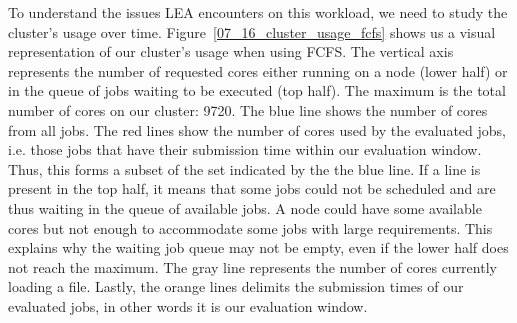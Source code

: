 \documentclass[conference,10pt]{IEEEtran}
\begin{document}
To understand the issues LEA encounters on this workload, we need to study the cluster's usage over time.
Figure~\ref{07_16_cluster_usage_fcfs} shows us a visual representation of 
our cluster's usage when using FCFS.
The vertical axis represents the number of requested cores either running on a
node (lower half) or in the queue of jobs waiting to be executed (top
half). The maximum is the total number of cores on our cluster: 9720.
The blue line shows the number of cores from all jobs.
The red lines show the number of cores used by the evaluated jobs, i.e.
those jobs that have their submission time within our evaluation window. Thus, this forms a subset
of the set indicated by the the blue line.
If a line is present in the top half, it means that some jobs could not be scheduled
and are thus waiting in the queue of available jobs. 
A node could have some available cores but not enough to accommodate some jobs with large requirements.
This explains why the waiting job queue may not be empty, even if the lower half does not reach the maximum.
The gray line represents the number of cores currently loading a file.
Lastly, the orange lines delimits the submission times of our 
evaluated jobs, in other words it is our evaluation window.
\end{document}
